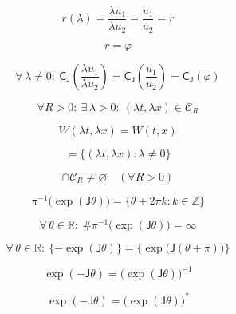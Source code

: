 \documentclass[12pt]{article}
\begin{document}
\begin{equation}
r(\lambda)=\frac{\lambda u_1}{\lambda u_2}=\frac{u_1}{u_2}=r
\end{equation}

\begin{equation}
r=\varphi
\end{equation}

\begin{equation}
\forall\,\lambda\neq 0:\ \mathsf{C}_{\mathsf{J}}\!\left(\frac{\lambda u_1}{\lambda u_2}\right)=\mathsf{C}_{\mathsf{J}}\!\left(\frac{u_1}{u_2}\right)=\mathsf{C}_{\mathsf{J}}(\varphi)
\end{equation}

\begin{equation}
\forall R>0:\ \exists\,\lambda>0:\ (\lambda t,\lambda x)\in\mathcal{C}_R
\end{equation}

\begin{equation}
W(\lambda t,\lambda x)=W(t,x)
\end{equation}

\begin{equation}
[(t,x)]=\{(\lambda t,\lambda x):\lambda\neq 0\}
\end{equation}

\begin{equation}
[(t,x)]\cap\mathcal{C}_R\neq\varnothing\quad(\forall R>0)
\end{equation}

\begin{equation}
\pi^{-1}\bigl(\exp(\mathsf{J}\theta)\bigr)=\{\theta+2\pi k:k\in\mathbb{Z}\}
\end{equation}

\begin{equation}
\forall\,\theta\in\mathbb{R}:\ \#\pi^{-1}\bigl(\exp(\mathsf{J}\theta)\bigr)=\infty
\end{equation}

\begin{equation}
\forall\,\theta\in\mathbb{R}:\ \{-\exp(\mathsf{J}\theta)\}=\{\exp\bigl(\mathsf{J}(\theta+\pi)\bigr)\}
\end{equation}

\begin{equation}
\exp(-\mathsf{J}\theta)=\big(\exp(\mathsf{J}\theta)\big)^{-1}
\end{equation}

\begin{equation}
\exp(-\mathsf{J}\theta)=\big(\exp(\mathsf{J}\theta)\big)^{*}
\end{equation}
\end{document}
